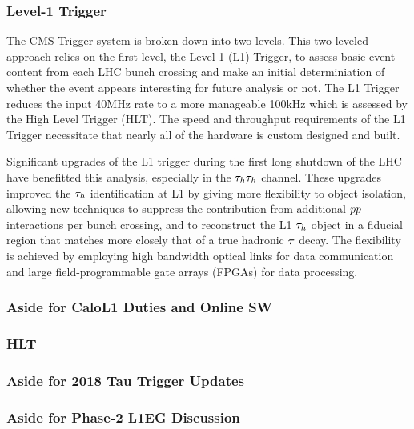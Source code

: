 \subsubsection{Level-1 Trigger}
The CMS Trigger system is broken down into two levels. This two leveled approach relies on
the first level, the Level-1 (L1) Trigger, to assess basic event content from each LHC
bunch crossing and make an initial determiniation of whether the event appears interesting for
future analysis or not. The L1 Trigger reduces the input 40MHz rate to a more manageable
100kHz which is assessed by the High Level Trigger (HLT). The speed and throughput requirements 
of the L1 Trigger necessitate that nearly all of the hardware is custom designed and built.



Significant upgrades of the L1 trigger during the first long shutdown of the LHC have benefitted this analysis, especially in the $\tau_{h}\tau_{h}$ channel. These upgrades improved the $\tau_{h}$ identification at L1 by giving more flexibility to object isolation, allowing new techniques to suppress the contribution from additional $pp$ interactions per bunch
crossing, and to reconstruct the L1 $\tau_{h}$ object in a fiducial region that matches more closely that of a true hadronic $\tau$ decay. The flexibility is achieved by employing high bandwidth optical links for data communication and large field-programmable gate arrays (FPGAs) for data processing.
\subsubsection{Aside for CaloL1 Duties and Online SW}
\subsubsection{HLT}
\subsubsection{Aside for 2018 Tau Trigger Updates}
\subsubsection{Aside for Phase-2 L1EG Discussion}



